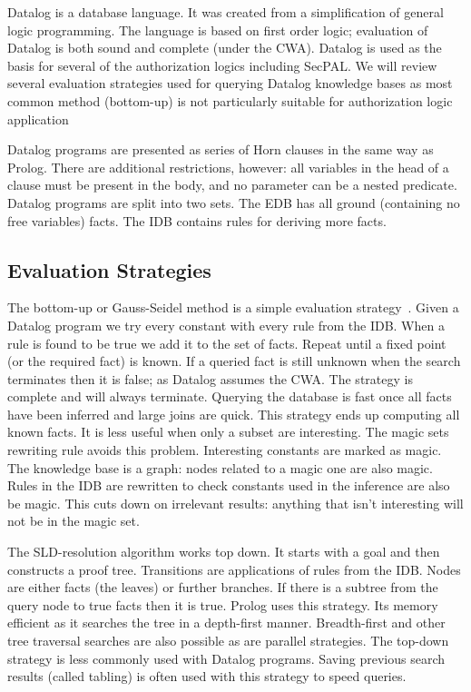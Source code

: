 \documentclass[thesis.tex]{subfiles}
\begin{document}
Datalog is a database language. It was created from a simplification
of general logic programming. The language is based on first order
logic; evaluation of Datalog is both sound and complete (under the
\ac{CWA}). Datalog is used as the basis for several of the
authorization logics including SecPAL. We will review several
evaluation strategies used for querying Datalog knowledge bases as
most common method (bottom-up) is not particularly suitable for
authorization logic application

Datalog programs are presented as series of Horn clauses in the same
way as Prolog. There are additional restrictions, however: all
variables in the head of a clause must be present in the body, and no
parameter can be a nested predicate.  Datalog programs are split into
two sets. The \ac{EDB} has all ground (containing no free variables)
facts. The \ac{IDB} contains rules for deriving more facts.

\subsection{Evaluation Strategies}

The bottom-up or Gauss-Seidel method is a simple evaluation
strategy~\cite{ceri_what_1989}. Given a Datalog program we try every
constant with every rule from the IDB. When a rule is found to be true
we add it to the set of facts. Repeat until a fixed point (or the
required fact) is known. If a queried fact is still unknown when the
search terminates then it is false; as Datalog assumes the CWA. The
strategy is complete and will always terminate.  Querying the database
is fast once all facts have been inferred and large joins are quick.
This strategy ends up computing all known facts. It is less useful
when only a subset are interesting. The magic
sets~\cite{bancilhon_magic_1986} rewriting rule avoids this
problem. Interesting constants are marked as magic. The knowledge base
is a graph: nodes related to a magic one are also magic. Rules in the
IDB are rewritten to check constants used in the inference are also be
magic. This cuts down on irrelevant results: anything that isn't
interesting will not be in the magic set.

The SLD-resolution algorithm works top down. It starts with a goal and
then constructs a proof tree. Transitions are applications of rules
from the IDB. Nodes are either facts (the leaves) or further
branches. If there is a subtree from the query node to true facts then
it is true. Prolog uses this strategy. Its memory efficient as it
searches the tree in a depth-first manner. Breadth-first and other
tree traversal searches are also possible as are parallel
strategies. The top-down strategy is less commonly used with Datalog
programs. Saving previous search results (called tabling) is often
used with this strategy to speed queries.
\end{document}
